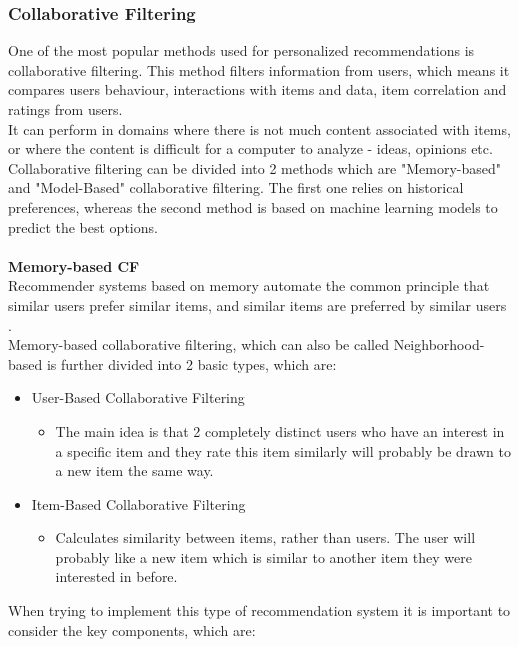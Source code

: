 \documentclass[\myFontSize,oneside,english,hidelinks,a4paper]{article}
\begin{document}
\subsubsection{Collaborative Filtering}
One of the most popular methods used for personalized recommendations is collaborative filtering. This method filters information from users, which means it compares users behaviour, interactions with items and data, item correlation and ratings from users. \\
It can perform in domains where there is not much content associated with items, or where the content is difficult for a computer to analyze - ideas, opinions etc.\cite{melville:aaai02}\\
Collaborative filtering can be divided into 2 methods which are "Memory-based" and "Model-Based" collaborative filtering. The first one relies on historical preferences, whereas the second method is based on machine learning models to predict the best options.\\\\
%
\textbf{Memory-based CF}\\
Recommender systems based on memory automate the common principle that similar users prefer similar items, and similar items are preferred by similar users \cite{Ning201537}. \\
Memory-based collaborative filtering, which can also be called Neighborhood-based is further divided into 2 basic types, which are:
\begin{itemize}
\item User-Based Collaborative Filtering
	\begin{itemize}
	\item The main idea is that 2 completely distinct users who have an interest in a specific item and they rate this item similarly will probably be drawn to a new item the same way.
	\end{itemize}
\item Item-Based Collaborative Filtering
	\begin{itemize}
	\item Calculates similarity between items, rather than users. The user will probably like a new item which is similar to another item they were interested in before.
	\end{itemize}
\end{itemize}
%
When trying to implement this type of recommendation system it is important to consider the key components, which are: 
\end{document}
